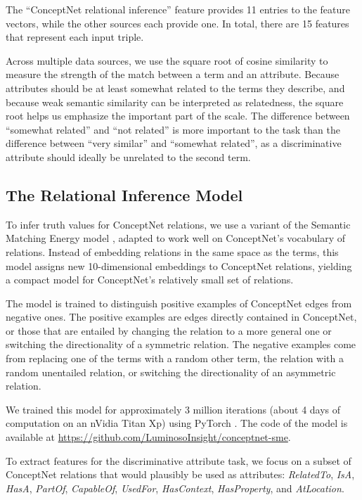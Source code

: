 \documentclass[11pt,a4paper]{article}
\begin{document}
The ``ConceptNet relational inference'' feature provides 11 entries to the
feature vectors, while the other sources each provide one. In total, there are 15
features that represent each input triple.

Across multiple data sources, we use the square root of cosine similarity to
measure the strength of the match between a term and an attribute.
Because attributes should be at least somewhat related to the terms they
describe, and because weak semantic similarity can be interpreted as relatedness,
the square root helps us emphasize the important part of the scale. The difference
between ``somewhat related'' and ``not related'' is more important to the task
than the difference between ``very similar'' and ``somewhat related'', as a
discriminative attribute should ideally be unrelated to the second term.

\subsection{The Relational Inference Model}

To infer truth values for ConceptNet relations, we use a variant of the
Semantic Matching Energy model \cite{bordes2014semantic}, adapted to work well on
ConceptNet's vocabulary of relations. Instead of embedding relations in the
same space as the terms, this model assigns new 10-dimensional embeddings
to ConceptNet relations, yielding a compact model for ConceptNet's relatively
small set of relations.

The model is trained to distinguish positive examples of ConceptNet edges
from negative ones. The positive examples are edges directly contained in
ConceptNet, or those that are entailed by changing the relation to a more
general one or switching the directionality of a symmetric relation. The
negative examples come from replacing one of the terms with a random other
term, the relation with a random unentailed relation, or switching the
directionality of an asymmetric relation.

We trained this model for approximately 3 million iterations (about 4 days of
computation on an nVidia Titan Xp) using PyTorch \cite{paszke2017automatic}.
The code of the model is available at
\url{https://github.com/LuminosoInsight/conceptnet-sme}.

To extract features for the discriminative attribute task, we focus on a subset
of ConceptNet relations that would plausibly be used as attributes:
\emph{RelatedTo}, \emph{IsA}, \emph{HasA}, \emph{PartOf},
\emph{CapableOf}, \emph{UsedFor}, \emph{HasContext},
\emph{HasProperty}, and \emph{AtLocation}.
\end{document}
